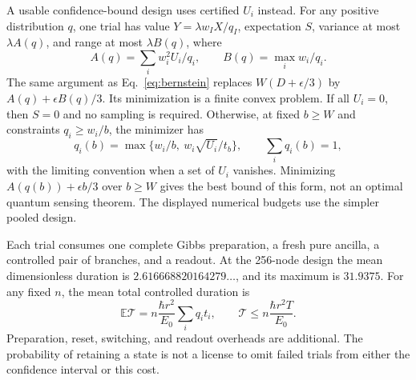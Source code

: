 \documentclass[aps,pra,reprint,superscriptaddress,longbibliography]{revtex4-2}
\begin{document}
A usable confidence-bound design uses certified $U_i$ instead.
For any positive distribution $q$, one trial has value
$Y=\lambda w_IX/q_I$, expectation $S$, variance at most
$\lambda A(q)$, and range at most $\lambda B(q)$, where
\begin{equation}
 A(q)=\sum_iw_i^2U_i/q_i,\qquad B(q)=\max_iw_i/q_i.
\end{equation}
The same argument as Eq.~\eqref{eq:bernstein} replaces $W(D+\epsilon/3)$
by $A(q)+\epsilon B(q)/3$. Its minimization is a finite convex
problem. If all $U_i=0$, then $S=0$ and no sampling is required.
Otherwise, at fixed $b\ge W$ and constraints $q_i\ge w_i/b$, the
minimizer has
\begin{equation}
 q_i(b)=\max\{w_i/b,\ w_i\sqrt{U_i}/t_b\},\qquad
                \sum_iq_i(b)=1,                              \label{eq:waterfill}
\end{equation}
with the limiting convention when a set of $U_i$ vanishes.
Minimizing $A(q(b))+\epsilon b/3$ over $b\ge W$ gives the best
bound of this form, not an optimal quantum sensing theorem.
The displayed numerical budgets use the simpler pooled design.

Each trial consumes one complete Gibbs preparation, a fresh pure
ancilla, a controlled pair of branches, and a readout. At the
256-node design the mean dimensionless duration is
$2.616668820164279\ldots$, and its maximum is $31.9375$.
For any fixed $n$, the mean total controlled duration is
\begin{equation}
 \mathbb E\mathcal T=n\frac{\hbar r^2}{E_0}\sum_iq_it_i,
 \qquad\mathcal T\le n\frac{\hbar r^2T}{E_0}.
\end{equation}
Preparation, reset, switching, and readout overheads are additional.
The probability of retaining a state is not a license to omit
failed trials from either the confidence interval or this cost.
\end{document}
